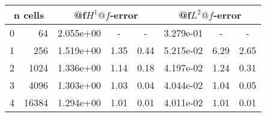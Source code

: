 \documentclass[10pt]{report}
\begin{document}
\begin{table}[H]
\begin{center}
\begin{tabular}{|c|r|c|c|c|c|c|c|} \hline

\multicolumn{2}{|c|}{n cells} & 
\multicolumn{3}{|c|}{@f$H^1@f$-error} & 
\multicolumn{3}{|c|}{@f$L^2@f$-error}\\ \hline
0 & 64 & 2.055e+00 & - & - & 3.279e-01 & - & -\\ \hline
1 & 256 & 1.519e+00 & 1.35 & 0.44 & 5.215e-02 & 6.29 & 2.65\\ \hline
2 & 1024 & 1.336e+00 & 1.14 & 0.18 & 4.197e-02 & 1.24 & 0.31\\ \hline
3 & 4096 & 1.303e+00 & 1.03 & 0.04 & 4.044e-02 & 1.04 & 0.05\\ \hline
4 & 16384 & 1.294e+00 & 1.01 & 0.01 & 4.011e-02 & 1.01 & 0.01\\ \hline
\end{tabular}
\end{center}
\end{table}
\end{document}
